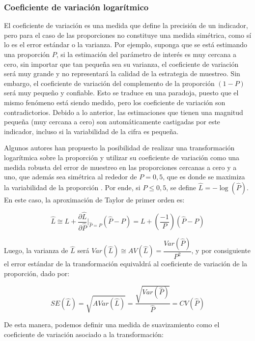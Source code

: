 \documentclass[
  10pt,
  spanish,
]{book}
\begin{document}
\hypertarget{coeficiente-de-variaciuxf3n-logaruxedtmico}{%
\subsubsection*{Coeficiente de variación logarítmico}\label{coeficiente-de-variaciuxf3n-logaruxedtmico}}

El coeficiente de variación es una medida que define la precisión de un indicador, pero para el caso de las proporciones no constituye una medida simétrica, como sí lo es el error estándar o la varianza. Por ejemplo, suponga que se está estimando una proporción \(P\), si la estimación del parámetro de interés es muy cercana a cero, sin importar que tan pequeña sea su varianza, el coeficiente de variación será muy grande y no representará la calidad de la estrategia de muestreo. Sin embargo, el coeficiente de variación del complemento de la proporción \((1-P)\) será muy pequeño y confiable. Esto se traduce en una paradoja, puesto que el mismo fenómeno está siendo medido, pero los coeficiente de variación son contradictorios. Debido a lo anterior, las estimaciones que tienen una magnitud pequeña (muy cercana a cero) son automáticamente castigadas por este indicador, incluso si la variabilidad de la cifra es pequeña.

Algunos autores han propuesto la posibilidad de realizar una transformación logarítmica sobre la proporción y utilizar su coeficiente de variación como una medida robusta del error de muestreo en las proporciones cercanas a cero y a uno, que además sea simétrica al rededor de \(P=0,5\), que es donde se maximiza la variabilidad de la proporción \citep{Barnett_Walker_Chromy_Davis_Emrich_Odom_Packer_2003}. Por ende, si \(P\leq 0,5\), se define \(\hat L = -\log( \hat P)\). En este caso, la aproximación de Taylor de primer orden es:

\[
\hat{L} \cong L + \frac{\partial \hat{L}}{\partial \hat{P}}\biggr\rvert_{\hat{P}=P} (\hat{P}-P) = L + \left(\frac{-1}{P}\right)(\hat{P}-P)
\]

Luego, la varianza de \(\hat{L}\) será \(Var(\hat{L})\cong AV(\hat{L}) = \dfrac{Var(\hat{P})}{P^2}\), y por consiguiente el error estándar de la transformación equivaldrá al coeficiente de variación de la proporción, dado por:

\[
SE(\hat{L}) = \sqrt{AVar(\hat{L})} = \dfrac{\sqrt{Var(\hat{P})}}{\hat{P}} = CV(\hat{P}) 
\]

De esta manera, podemos definir una medida de suavizamiento como el coeficiente de variación asociado a la transformación:
\end{document}
